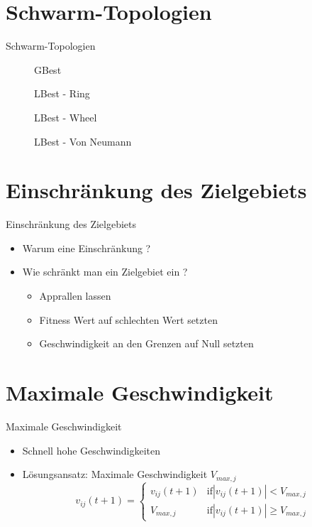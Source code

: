 \section{Schwarm-Topologien}
\begin{frame}{Schwarm-Topologien}
	\begin{figure}[htbp]
		\centering
		\begin{minipage}{4cm}
			\centering
			
			GBest
		\end{minipage}
		\begin{minipage}{4cm}
			\centering
			
			LBest - Ring
		\end{minipage}
		\begin{minipage}{4cm}
			\centering
			
			LBest - Wheel
		\end{minipage}
		\begin{minipage}{4cm}
			\centering
			
			LBest - Von Neumann
		\end{minipage}
	\end{figure}		
\end{frame}

\section[Zielgebiet]{Einschränkung des Zielgebiets}
\begin{frame}{Einschränkung des Zielgebiets}
	\begin{itemize}
		\item Warum eine Einschränkung ?
		\item Wie schränkt man ein Zielgebiet ein ?
		\begin{itemize}
			\item Apprallen lassen
			\item Fitness Wert auf schlechten Wert setzten
			\item Geschwindigkeit an den Grenzen auf Null setzten
		\end{itemize}
	\end{itemize}
\end{frame}

\section[Geschwindigkeit]{Maximale Geschwindigkeit}
\begin{frame}{Maximale Geschwindigkeit}
	\begin{itemize}
		\item Schnell hohe Geschwindigkeiten
		\item Lösungsansatz: Maximale Geschwindigkeit $V_{max,j}$
			\begin{equation*}
				v_{ij}(t+1) = 
				\begin{cases}
					v_{ij}(t+1) & \text{if} |v_{ij}(t+1)| < V_{max,j} \\
					V_{max,j} & \text{if} |v_{ij}(t+1)| \geq V_{max,j}
				\end{cases}
			\end{equation*} 
	\end{itemize}
\end{frame}

